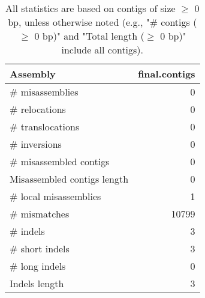 \documentclass[12pt,a4paper]{article}
\begin{document}
\begin{table}[ht]
\begin{center}
\caption{All statistics are based on contigs of size $\geq$ 0 bp, unless otherwise noted (e.g., "\# contigs ($\geq$ 0 bp)" and "Total length ($\geq$ 0 bp)" include all contigs).}
\begin{tabular}{|l*{1}{|r}|}
\hline
Assembly & final.contigs \\ \hline
\# misassemblies & 0 \\ \hline
\hspace{5mm}\# relocations & 0 \\ \hline
\hspace{5mm}\# translocations & 0 \\ \hline
\hspace{5mm}\# inversions & 0 \\ \hline
\# misassembled contigs & 0 \\ \hline
Misassembled contigs length & 0 \\ \hline
\# local misassemblies & 1 \\ \hline
\# mismatches & 10799 \\ \hline
\# indels & 3 \\ \hline
\hspace{5mm}\# short indels & 3 \\ \hline
\hspace{5mm}\# long indels & 0 \\ \hline
Indels length & 3 \\ \hline
\end{tabular}
\end{center}
\end{table}
\end{document}
